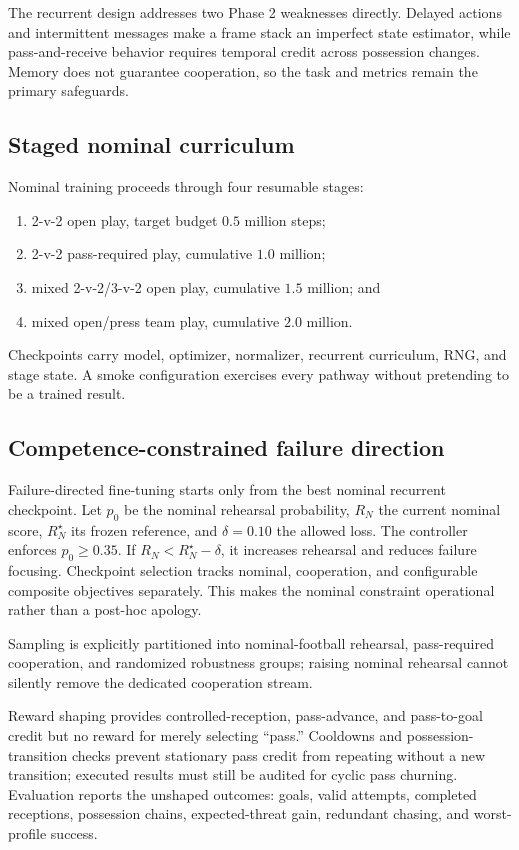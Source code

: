 \documentclass[12pt,twocolumn]{article}
\begin{document}
The recurrent design addresses two Phase 2 weaknesses directly. Delayed actions and intermittent
messages make a frame stack an imperfect state estimator, while pass-and-receive behavior requires
temporal credit across possession changes. Memory does not guarantee cooperation, so the task and
metrics remain the primary safeguards.

\subsection{Staged nominal curriculum}
Nominal training proceeds through four resumable stages:
\begin{enumerate}
\item 2-v-2 open play, target budget $0.5$ million steps;
\item 2-v-2 pass-required play, cumulative $1.0$ million;
\item mixed 2-v-2/3-v-2 open play, cumulative $1.5$ million; and
\item mixed open/press team play, cumulative $2.0$ million.
\end{enumerate}
Checkpoints carry model, optimizer, normalizer, recurrent curriculum, RNG, and stage state. A smoke
configuration exercises every pathway without pretending to be a trained result.

\subsection{Competence-constrained failure direction}
Failure-directed fine-tuning starts only from the best nominal recurrent checkpoint. Let $p_0$ be
the nominal rehearsal probability, $R_N$ the current nominal score, $R_N^\star$ its frozen
reference, and $\delta=0.10$ the allowed loss. The controller enforces $p_0\geq0.35$. If
$R_N<R_N^\star-\delta$, it increases rehearsal and reduces failure focusing. Checkpoint selection
tracks nominal, cooperation, and configurable composite objectives separately. This makes the
nominal constraint operational rather than a post-hoc apology.

Sampling is explicitly partitioned into nominal-football rehearsal, pass-required cooperation,
and randomized robustness groups; raising nominal rehearsal cannot silently remove the dedicated
cooperation stream.

Reward shaping provides controlled-reception, pass-advance, and pass-to-goal credit but no reward
for merely selecting ``pass.'' Cooldowns and possession-transition checks prevent stationary pass
credit from repeating without a new transition; executed results must still be audited for
cyclic pass churning. Evaluation reports the unshaped outcomes: goals, valid attempts, completed
receptions, possession chains, expected-threat gain, redundant chasing, and worst-profile success.
\end{document}
